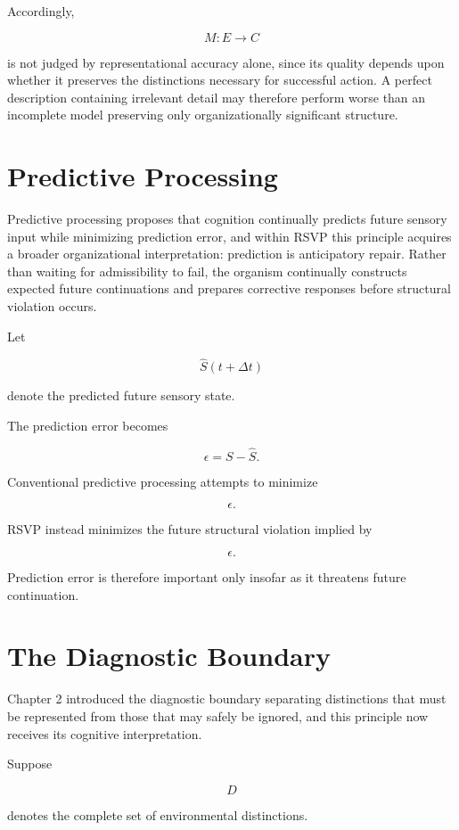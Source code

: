 \documentclass[11pt,oneside]{book}
\numberwithin{equation}{chapter}
\theoremstyle{definition}
\theoremstyle{plain}
\begin{document}
Accordingly,

\[
M : E \rightarrow C
\]

is not judged by representational accuracy alone, since its quality depends upon whether it preserves the distinctions necessary for successful action. A perfect description containing irrelevant detail may therefore perform worse than an incomplete model preserving only organizationally significant structure.

\section{Predictive Processing}

Predictive processing proposes that cognition continually predicts future sensory input while minimizing prediction error, and within RSVP this principle acquires a broader organizational interpretation: prediction is anticipatory repair. Rather than waiting for admissibility to fail, the organism continually constructs expected future continuations and prepares corrective responses before structural violation occurs.

Let

\[
\hat S(t+\Delta t)
\]

denote the predicted future sensory state.

The prediction error becomes

\[
\epsilon = S - \hat S.
\]

Conventional predictive processing attempts to minimize

\[
\epsilon.
\]

RSVP instead minimizes the future structural violation implied by

\[
\epsilon.
\]

Prediction error is therefore important only insofar as it threatens future
continuation.

\section{The Diagnostic Boundary}

Chapter 2 introduced the diagnostic boundary separating distinctions that must be represented from those that may safely be ignored, and this principle now receives its cognitive interpretation.

Suppose

\[
D
\]

denotes the complete set of environmental distinctions.
\end{document}
